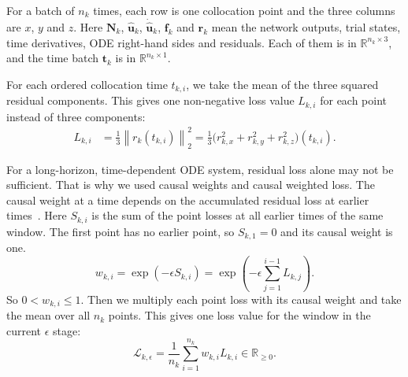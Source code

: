 \documentclass[conference,a4paper]{IEEEtran}
\begin{document}
For a batch of $n_k$ times, each row is one collocation point and the three columns are $x$, $y$ and $z$. Here $\mathbf{N}_k$, $\hat{\mathbf{u}}_k$, $\dot{\hat{\mathbf{u}}}_k$, $\mathbf{f}_k$ and $\mathbf{r}_k$ mean the network outputs, trial states, time derivatives, ODE right-hand sides and residuals. Each of them is in $\mathbb{R}^{n_k\times3}$, and the time batch $\mathbf{t}_k$ is in $\mathbb{R}^{n_k\times1}$.

For each ordered collocation time $t_{k,i}$, we take the mean of the three squared residual components. This gives one non-negative loss value $L_{k,i}$ for each point instead of three components:
\begin{equation}
\begin{aligned}
L_{k,i}
  &=\tfrac{1}{3}\left\|r_k(t_{k,i})\right\|_2^2=\tfrac{1}{3}\bigl(r_{k,x}^2+r_{k,y}^2+r_{k,z}^2\bigr)(t_{k,i}).
\end{aligned}
\label{eq:pointloss}
\end{equation}

For a long-horizon, time-dependent ODE system, residual loss alone may not be sufficient. That is why we used causal weights and causal weighted loss. The causal weight at a time depends on the accumulated residual loss at earlier times~\cite{wang2024causal}. Here $S_{k,i}$ is the sum of the point losses at all earlier times of the same window. The first point has no earlier point, so $S_{k,1}=0$ and its causal weight is one.
\begin{equation}
w_{k,i}
=\exp\left(-\epsilon S_{k,i}\right)
=\exp\left(-\epsilon\sum_{j=1}^{i-1}L_{k,j}\right).
\label{eq:weights}
\end{equation}
So $0<w_{k,i}\leq1$. Then we multiply each point loss with its causal weight and take the mean over all $n_k$ points. This gives one loss value for the window in the current $\epsilon$ stage:
\begin{equation}
\mathcal{L}_{k,\epsilon}
=\frac{1}{n_k}
 \sum_{i=1}^{n_k}w_{k,i}L_{k,i}
\in\mathbb{R}_{\geq0}.
\label{eq:causalloss}
\end{equation}
\end{document}
